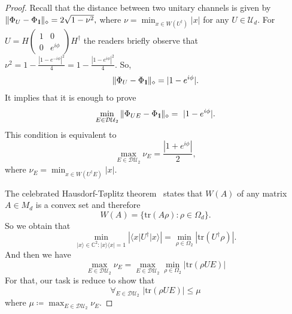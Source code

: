 \documentclass[preprint,12pt, a4paper]{elsarticle}
\newcommand{\ket}[1]{\ensuremath{|#1\rangle}}
\newcommand{\bra}[1]{\ensuremath{\langle#1|}}
\newcommand{\ketbra}[2]{\ensuremath{\ket{#1}\bra{#2}}}
\newcommand{\proj}[1]{\ensuremath{\ketbra{#1}{#1}}}
\newcommand{\1}{{\rm 1\hspace{-0.9mm}l}}
\newcommand{\Id}{{\rm 1\hspace{-0.9mm}l}}
\newcommand{\diaguni}{\ensuremath{\mathcal{DU}}}
\newcommand{\tr}{\mathrm{tr}}
\begin{document}
\begin{proof} Recall that the distance between two unitary channels is given by
	$
	\| \Phi_U  - \Phi_{\1} \|_\diamond = 2 \sqrt{1-\nu^2},
	$
	where $\nu = \min_{x \in W(U^\dagger)} |x|  $ for any $U \in \mathcal{U}_d$. 
	For $U = H 
	\left(\begin{array}{cc}1&0\\0&e^{i \phi}\end{array}\right)  H^\dagger$ the readers briefly observe that  $\nu^2 = 1 - \frac{|1 - e^{-i \phi} |^2 }{4} = 1 - \frac{|1 - e^{i \phi} |^2 }{4}$. So, 
	\begin{equation}
	\|  \Phi_U  - \Phi_{\1} \|_\diamond = | 1 - e^{i \phi} |. 
	\end{equation} 
		It implies that it is enough to prove  \begin{equation}
		\min_{E \in \diaguni_2} \|\Phi_{UE} - 
		\Phi_\Id\|_\diamond  = | 1 - e^{i \phi} |.
		\end{equation}
This condition is equivalent to 
	\begin{equation}
	\max_{E \in \diaguni_2 } \nu_{E} = \frac{|1 + e^{i \phi} | }{2},
	\end{equation}
	where $\nu_E = \min_{x \in W(U^\dagger E)} |x|. $ 
	
 The celebrated Hausdorf-T{\o}plitz theorem~\cite{hausdorff, toeplitz} states that
$W(A)$ of any matrix $A \in M_d$ is a convex set and therefore
\begin{equation}
W(A) = \{ \tr(A \rho): \rho \in \Omega_d\}. 
\end{equation}
So we obtain that 
	\begin{equation}
	\min_{\ket{x} \in \mathbb{C}^2:   \proj{x} = 1} |\bra{x}U^\dagger\ket{x}| = 
	\min_{\rho \in \Omega_2} |\tr(U^\dagger\rho)|. 
	\end{equation}
	And then we have 
	 \begin{equation}
 \max_{E \in \diaguni_2 } \nu_{E}  = \max_{E \in \diaguni_2 }  \min_{\rho \in 
		\Omega_2} \left| \tr \left( \rho U E \right) \right|
	\end{equation}
	For that, our task is reduce to show that
	\begin{equation}
	\forall_{E \in \diaguni_2} \,\, | \tr \left(\rho U E\right) | \le \mu
	\end{equation}
	where $\mu \coloneqq \max_{E \in \diaguni_2 } \nu_{E}.$
	

\end{proof}
\end{document}
